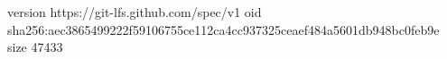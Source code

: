 version https://git-lfs.github.com/spec/v1
oid sha256:aec3865499222f59106755ce112ca4cc937325ceaef484a5601db948bc0feb9e
size 47433
